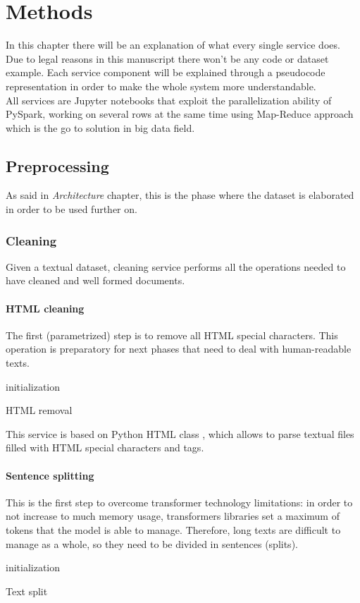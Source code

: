 \documentclass[\main/main.tex]{subfiles}
\begin{document}
\chapter{Methods}
\label{methods}
In this chapter there will be an explanation of what every single service does. Due to legal reasons in this manuscript there won't be any code or dataset example. Each service component will be explained through a pseudocode representation in order to make the whole system more understandable.\\
All services are Jupyter notebooks that exploit the parallelization ability of PySpark, working on several rows at the same time using Map-Reduce approach which is the go to solution in big data field.
\section{Preprocessing}
As said in \emph{Architecture} chapter, this is the phase where the dataset is elaborated in order to be used further on. 
\subsection{Cleaning}
Given a textual dataset, cleaning service performs all the operations needed to have cleaned and well formed documents.
\subsubsection{HTML cleaning}
The first (parametrized) step is to remove all HTML special characters. This operation is preparatory for next phases that need to deal with human-readable texts.
\begin{center}
    \begin{algorithm}[H]
     initialization
     \caption{HTML removal}
    \end{algorithm}
\end{center}
This service is based on Python HTML class \cite{html_parser}, which allows to parse textual files filled with HTML special characters and tags.
\subsubsection{Sentence splitting}
This is the first step to overcome transformer technology limitations: in order to not increase to much memory usage, transformers libraries set a maximum of tokens that the model is able to manage. Therefore, long texts are difficult to manage as a whole, so they need to be divided in sentences (splits).
\begin{center}
    \begin{algorithm}[H]
     initialization
     \caption{Text split}
    \end{algorithm}
\end{center}
\end{document}
